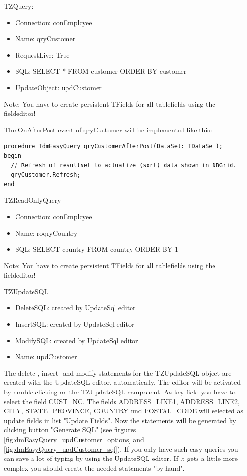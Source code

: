 \documentclass[a4paper,12pt,oneside]{book}
\begin{document}
TZQuery:
\begin{itemize}
  \item Connection: conEmployee
  \item Name: qryCustomer
  \item RequestLive: True
  \item SQL: SELECT * FROM customer ORDER BY customer
  \item UpdateObject: updCustomer
\end{itemize}

Note: You have to create persistent TFields for all tablefields using the fieldeditor!

The OnAfterPost event of qryCustomer will be implemented like this:
\begin{verbatim}
procedure TdmEasyQuery.qryCustomerAfterPost(DataSet: TDataSet);
begin
  // Refresh of resultset to actualize (sort) data shown in DBGrid.
  qryCustomer.Refresh;
end;
\end{verbatim}

TZReadOnlyQuery
\begin{itemize}
  \item Connection: conEmployee
	\item Name: roqryCountry
	\item SQL: SELECT country FROM country ORDER BY 1
\end{itemize}

Note: You have to create persistent TFields for all tablefields using the fieldeditor!

TZUpdateSQL
\begin{itemize}
  \item DeleteSQL: created by UpdateSql editor
  \item InsertSQL: created by UpdateSql editor
  \item ModifySQL: created by UpdateSql editor
  \item Name: updCustomer
\end{itemize}

The delete-, insert- and modify-statements for the TZUpdateSQL object are created with the UpdateSQL editor, automatically.
The editor will be activated by double clicking on the TZUpdateSQL component.
As key field you have to select the field CUST\_NO. The fields ADDRESS\_LINE1, ADDRESS\_LINE2, CITY, STATE\_PROVINCE, COUNTRY und POSTAL\_CODE will selected as update fields in list "Update Fields".
Now the statements will be generated by clicking button "Generate SQL" (see firgures \ref{fig:dmEasyQuery_updCustomer_options} and \ref{fig:dmEasyQuery_updCustomer_sql}).
If you only have such easy queries you can save a lot of typing by using the UpdateSQL editor.
If it gets a little more complex you should create the needed statements "by hand".
\end{document}
